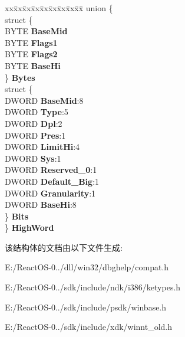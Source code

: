 \begin{DoxyCompactItemize}
\begin{tabbing}
\end{tabbing}\item 
\mbox{\label{struct___l_d_t___e_n_t_r_y_afde1a6872a636971aff671ba127acb8e}} 
\begin{tabbing}
xx\=xx\=xx\=xx\=xx\=xx\=xx\=xx\=xx\=\kill
union \{\\
\>struct \{\\
\>\>BYTE {\bfseries BaseMid}\\
\>\>BYTE {\bfseries Flags1}\\
\>\>BYTE {\bfseries Flags2}\\
\>\>BYTE {\bfseries BaseHi}\\
\>\} {\bfseries Bytes}\\
\>struct \{\\
\>\>DWORD {\bfseries BaseMid}:8\\
\>\>DWORD {\bfseries Type}:5\\
\>\>DWORD {\bfseries Dpl}:2\\
\>\>DWORD {\bfseries Pres}:1\\
\>\>DWORD {\bfseries LimitHi}:4\\
\>\>DWORD {\bfseries Sys}:1\\
\>\>DWORD {\bfseries Reserved\_0}:1\\
\>\>DWORD {\bfseries Default\_Big}:1\\
\>\>DWORD {\bfseries Granularity}:1\\
\>\>DWORD {\bfseries BaseHi}:8\\
\>\} {\bfseries Bits}\\
\} {\bfseries HighWord}\\

\end{tabbing}\end{DoxyCompactItemize}


该结构体的文档由以下文件生成\+:\begin{DoxyCompactItemize}
\item 
E\+:/\+React\+O\+S-\/0../dll/win32/dbghelp/compat.\+h\item 
E\+:/\+React\+O\+S-\/0../sdk/include/ndk/i386/ketypes.\+h\item 
E\+:/\+React\+O\+S-\/0../sdk/include/psdk/winbase.\+h\item 
E\+:/\+React\+O\+S-\/0../sdk/include/xdk/winnt\+\_\+old.\+h\end{DoxyCompactItemize}
